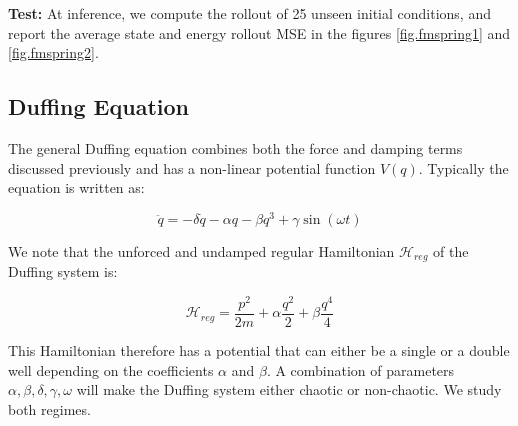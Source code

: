 \documentclass[twoside]{article}
\begin{document}
\textbf{Test:} At inference, we compute the rollout of 25 unseen initial conditions, and report the average state and energy rollout MSE in the figures \ref{fig.fmspring1} and \ref{fig.fmspring2}.

\subsection{Duffing Equation}

The general Duffing equation combines both the force and damping terms discussed previously and has a non-linear potential function $V(q)$. Typically the equation is written as:

\begin{equation}
\ddot{q} = -\delta \dot{q} -\alpha q -\beta q^3 +\gamma \sin(\omega t) 
\end{equation}

We note that the unforced and undamped regular Hamiltonian $\mathcal{H}_{reg}$ of the Duffing system is:

\begin{equation}
\mathcal{H}_{reg} = \frac{p^2}{2m}+ \alpha \frac{q^2}{2} + \beta \frac{q^4}{4}
\end{equation}

This Hamiltonian therefore has a potential that can either be a single or a double well depending on the coefficients $\alpha$ and $\beta$. A combination of parameters $\alpha,\beta,\delta,\gamma,\omega$ will make the Duffing system either chaotic or non-chaotic. We study both regimes.
\end{document}
